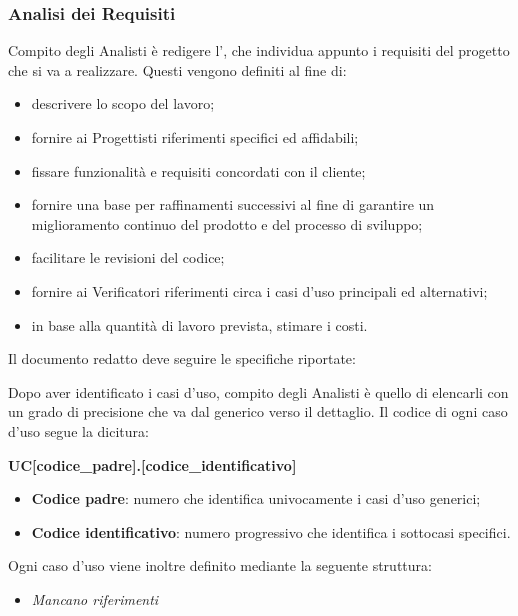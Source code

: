             \subsubsection{Analisi dei Requisiti}
            Compito degli Analisti è redigere l'\AdR{}, che individua appunto i requisiti del progetto che si va a realizzare. Questi vengono definiti al fine di:
            \begin{itemize}
        		\item{descrivere lo scopo del lavoro;}
		\item{fornire ai Progettisti riferimenti specifici ed affidabili;}
		\item{fissare funzionalità e requisiti concordati con il cliente;}
		\item{fornire una base per raffinamenti successivi al fine di garantire un miglioramento continuo del prodotto e del processo di sviluppo;}
		\item{facilitare le revisioni del codice;}
		\item{fornire ai Verificatori riferimenti circa i casi d'uso principali ed alternativi;}
		\item{in base alla quantità di lavoro prevista, stimare i costi.}
        	   \end{itemize}
                 
                 Il documento redatto deve seguire le specifiche riportate:
                 
                Dopo aver identificato i casi d'uso, compito degli Analisti è quello di elencarli con un grado di precisione che va dal generico verso il dettaglio.
                Il codice di ogni caso d'uso segue la dicitura: 
                \begin{center}
                \textbf{UC[codice\_padre].[codice\_identificativo]}
                \end{center}
                
                \begin{itemize}
                 	\item{\textbf{Codice padre}: numero che identifica univocamente i casi d'uso generici;}
			\item{\textbf{Codice identificativo}: numero progressivo che identifica i sottocasi specifici.}
                \end{itemize}
                
                Ogni caso d'uso viene inoltre definito mediante la seguente struttura:
                \begin{itemize}
                \item{\textit{Mancano riferimenti}}
                \end{itemize}
                
